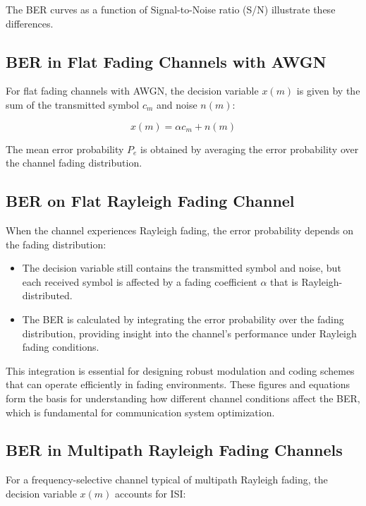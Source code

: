 The BER curves as a function of Signal-to-Noise ratio (S/N) illustrate these differences.

\subsection*{BER in Flat Fading Channels with AWGN}

For flat fading channels with AWGN, the decision variable \( x(m) \) is given by the sum of the transmitted symbol \( c_m \) and noise \( n(m) \):

\begin{equation}
    x(m) = \alpha c_m + n(m)
\end{equation}

The mean error probability \( P_e \) is obtained by averaging the error probability over the channel fading distribution.
\subsection*{BER on Flat Rayleigh Fading Channel}

When the channel experiences Rayleigh fading, the error probability depends on the fading distribution:

\begin{itemize}
    \item The decision variable still contains the transmitted symbol and noise, but each received symbol is affected by a fading coefficient \( \alpha \) that is Rayleigh-distributed.
    \item The BER is calculated by integrating the error probability over the fading distribution, providing insight into the channel's performance under Rayleigh fading conditions.
\end{itemize}

This integration is essential for designing robust modulation and coding schemes that can operate efficiently in fading environments.
These figures and equations form the basis for understanding how different channel conditions affect the BER, which is fundamental for communication system optimization.

\subsection*{BER in Multipath Rayleigh Fading Channels}

For a frequency-selective channel typical of multipath Rayleigh fading, the decision variable \( x(m) \) accounts for ISI:

